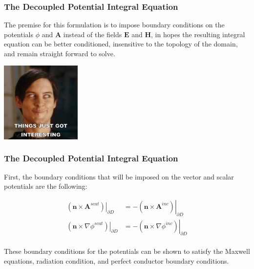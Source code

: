 \documentclass{beamer}
\newcommand{\bvec}[1]{\boldsymbol{#1}}
\begin{document}
	\begin{frame}
	\frametitle{The Decoupled Potential Integral Equation}
	The premise for this formulation is to impose boundary conditions on the potentials $\phi$ and $\bvec{A}$ instead of the fields $\bvec{E}$ and $\bvec{H}$, in hopes the resulting integral equation can be better conditioned, insensitive to the topology of the domain, and remain straight forward to solve.
	
	\vspace{0.1in}
	\begin{center}
		\includegraphics[width=4cm,frame]{gotInteresting}
	\end{center}
	\end{frame}

	\begin{frame}
	\frametitle{The Decoupled Potential Integral Equation}
	First, the boundary conditions that will be imposed on the vector and scalar potentials are the following:
	
	\begin{align*}
	\left. \left(\bvec{n} \times \bvec{A}^{scat}\right)\right|_{\partial D} &= - \left. \left(\bvec{n} \times \bvec{A}^{inc}\right)\right|_{\partial D} \\
	\left. \left(\bvec{n} \times \nabla \phi^{scat}\right)\right|_{\partial D} &= - \left. \left(\bvec{n} \times  \nabla \phi^{inc}\right)\right|_{\partial D} \\
	\end{align*}
	
	These boundary conditions for the potentials can be shown to satisfy the Maxwell equations, radiation condition, and perfect conductor boundary conditions.
	\end{frame}
\end{document}
